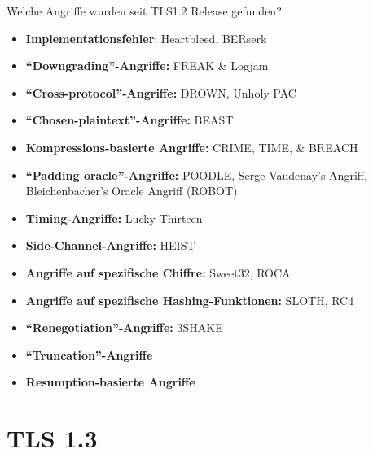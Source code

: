 \documentclass{f4_beamer_metropolis}
\begin{document}
\begin{frame}{Welche Angriffe wurden seit TLS1.2 Release gefunden?}
  \begin{itemize}
    \item \textbf{Implementationsfehler}: Heartbleed, BERserk
    \item \textbf{\enquote{Downgrading}-Angriffe:} FREAK \& Logjam
    \item \textbf{\enquote{Cross-protocol}-Angriffe:} DROWN, Unholy PAC
    \item \textbf{\enquote{Chosen-plaintext}-Angriffe:} BEAST
    \item \textbf{Kompressions-basierte Angriffe:} CRIME, TIME, \& BREACH
    \item \textbf{\enquote{Padding oracle}-Angriffe:} POODLE, Serge Vaudenay's Angriff, Bleichenbacher's Oracle Angriff (ROBOT)
    \item \textbf{Timing-Angriffe:} Lucky Thirteen
    \item \textbf{Side-Channel-Angriffe:} HEIST
    \item \textbf{Angriffe auf spezifische Chiffre:} Sweet32, ROCA
    \item \textbf{Angriffe auf spezifische Hashing-Funktionen:} SLOTH, RC4
    \item \textbf{\enquote{Renegotiation}-Angriffe:} 3SHAKE
    \item \textbf{\enquote{Truncation}-Angriffe}
    \item \textbf{Resumption-basierte Angriffe}
  \end{itemize}

\end{frame}

\section{TLS 1.3}
\end{document}
